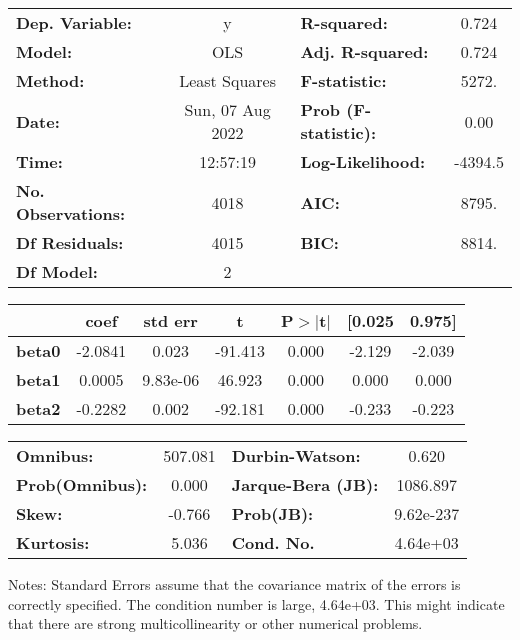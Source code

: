 \begin{center}
\begin{tabular}{lclc}
\toprule
\textbf{Dep. Variable:}    &        y         & \textbf{  R-squared:         } &     0.724   \\
\textbf{Model:}            &       OLS        & \textbf{  Adj. R-squared:    } &     0.724   \\
\textbf{Method:}           &  Least Squares   & \textbf{  F-statistic:       } &     5272.   \\
\textbf{Date:}             & Sun, 07 Aug 2022 & \textbf{  Prob (F-statistic):} &     0.00    \\
\textbf{Time:}             &     12:57:19     & \textbf{  Log-Likelihood:    } &   -4394.5   \\
\textbf{No. Observations:} &        4018      & \textbf{  AIC:               } &     8795.   \\
\textbf{Df Residuals:}     &        4015      & \textbf{  BIC:               } &     8814.   \\
\textbf{Df Model:}         &           2      & \textbf{                     } &             \\
\bottomrule
\end{tabular}
\begin{tabular}{lcccccc}
               & \textbf{coef} & \textbf{std err} & \textbf{t} & \textbf{P$> |$t$|$} & \textbf{[0.025} & \textbf{0.975]}  \\
\midrule
\textbf{beta0} &      -2.0841  &        0.023     &   -91.413  &         0.000        &       -2.129    &       -2.039     \\
\textbf{beta1} &       0.0005  &     9.83e-06     &    46.923  &         0.000        &        0.000    &        0.000     \\
\textbf{beta2} &      -0.2282  &        0.002     &   -92.181  &         0.000        &       -0.233    &       -0.223     \\
\bottomrule
\end{tabular}
\begin{tabular}{lclc}
\textbf{Omnibus:}       & 507.081 & \textbf{  Durbin-Watson:     } &     0.620  \\
\textbf{Prob(Omnibus):} &   0.000 & \textbf{  Jarque-Bera (JB):  } &  1086.897  \\
\textbf{Skew:}          &  -0.766 & \textbf{  Prob(JB):          } & 9.62e-237  \\
\textbf{Kurtosis:}      &   5.036 & \textbf{  Cond. No.          } &  4.64e+03  \\
\bottomrule
\end{tabular}
\end{center}

Notes: \newline
 [1] Standard Errors assume that the covariance matrix of the errors is correctly specified. \newline
 [2] The condition number is large, 4.64e+03. This might indicate that there are \newline
 strong multicollinearity or other numerical problems.